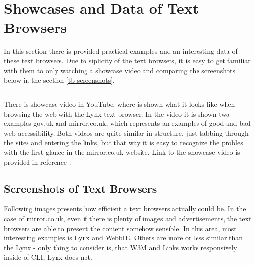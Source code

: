 \section[tb-general]{Showcases and Data of Text Browsers}
In this section there is provided practical examples and an interesting data  of these text browsers. Due to siplicity of the text browsers, it is easy to get familiar with them to only watching a showcase video and comparing the screenshots below in the section \ref*{tb-screenshots}.
\subsection[tb-showcase]{}
There is showcase video in YouTube, where is shown what it looks like when browsing the web with the Lynx text browser. In the video it is shown two examples gov.uk and mirror.co.uk, which represents an examples of good and bad web accessibility. Both videos are quite similar in structure, just tabbing through the sites and entering the links, but that way it is easy to recognize the probles with the first glance in the mirror.co.uk website. Link to the showcase video is provided in reference \textcite{tb-showcase}.
\subsection[tb-screenshots]{Screenshots of Text Browsers}
Following images presents how efficient a text browsers actually could be. In the case of mirror.co.uk, even if there is plenty of images and advertisements, the text browsers are able to present the content somehow sensible. In this area, most interesting examples is Lynx and WebbIE. Others are more or less similar than the Lynx - only thing to consider is, that W3M and Links works responsively inside of CLI, Lynx does not.

